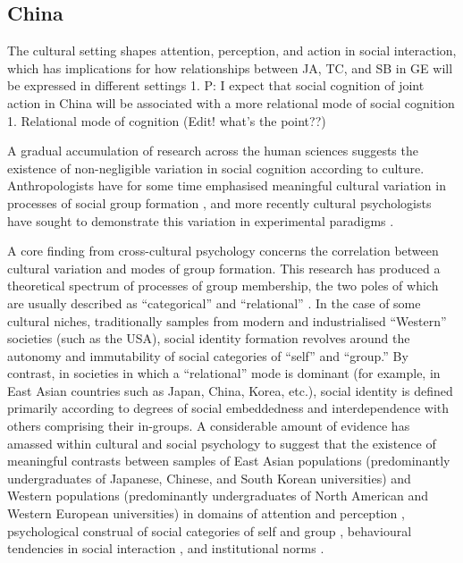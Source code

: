 \begin{CJK}{UTF8}{gbsn}
\section{China}
The cultural setting shapes attention, perception, and action in social interaction, which has implications for how relationships between JA, TC, and SB in GE will be expressed in different settings
        1. P: I expect that social cognition of joint action in China will be associated with a more relational mode of social cognition
            1. Relational mode of cognition (Edit! what’s the point??)

A gradual accumulation of research across the human sciences suggests the existence of non-negligible variation in social cognition according to culture.  Anthropologists have for some time emphasised meaningful cultural variation in processes of social group formation \citep{Strodtbeck1961,Kluckhohn1961,Mead1967,Fei1992}, and more recently cultural psychologists have sought to demonstrate this variation in experimental paradigms \citep{Markus1991,Nisbett2001}. %

A core finding from cross-cultural psychology concerns the correlation between cultural variation and modes of group formation.  This research has produced a theoretical spectrum of processes of group membership, the two poles of which are usually described as ``categorical'' and ``relational'' \citep{Hofstede1980,Brewer2007}.  In the case of some cultural niches, traditionally samples from modern and industrialised ``Western'' societies (such as the USA), social identity formation revolves around the autonomy and immutability of social categories of ``self'' and ``group.''  By contrast, in societies in which a ``relational'' mode is dominant (for example, in East Asian countries such as Japan, China, Korea, etc.), social identity is defined primarily according to degrees of social embeddedness and interdependence with others comprising their in-groups\citep{Leung2012}.  A considerable amount of evidence has amassed within cultural and social psychology to suggest that the existence of meaningful contrasts between samples of East Asian populations (predominantly undergraduates of Japanese, Chinese, and South Korean universities) and Western populations (predominantly undergraduates of North American and Western European universities) in domains of attention and perception \citep{Peng1997,Nisbett2003}, psychological construal of social categories of self and group \citep{Markus1991}, behavioural tendencies in social interaction \citep{Yuki2003}, and institutional norms \citep{Liu2017}.


\end{CJK}
